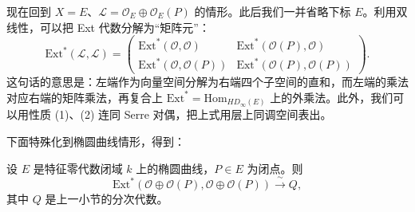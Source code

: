 现在回到 $X=E$、$\mathcal{L}=\mathcal{O}_E\oplus\mathcal{O}_E(P)$ 的情形。此后我们一并省略下标 $E$。利用双线性，可以把 Ext 代数分解为“矩阵元”：
\begin{equation}\label{eq:6.2-1}
\mathrm{Ext}^*(\mathcal{L},\mathcal{L})=
\begin{pmatrix}
\mathrm{Ext}^*(\mathcal{O},\mathcal{O}) & \mathrm{Ext}^*(\mathcal{O}(P),\mathcal{O})\\[2pt]
\mathrm{Ext}^*(\mathcal{O},\mathcal{O}(P)) & \mathrm{Ext}^*(\mathcal{O}(P),\mathcal{O}(P))
\end{pmatrix}.
\end{equation}
这句话的意思是：左端作为向量空间分解为右端四个子空间的直和，而左端的乘法对应右端的矩阵乘法，再复合上 $\mathrm{Ext}^*=\mathrm{Hom}_{HD_\infty(E)}$ 上的外乘法。此外，我们可以用性质 (1)、(2) 连同 Serre 对偶，把上式用层上同调空间表出。


下面特殊化到椭圆曲线情形，得到：

\begin{proposition}\label{prop:6.3}
设 $E$ 是特征零代数闭域 $k$ 上的椭圆曲线，$P\in E$ 为闭点。则
\[
\mathrm{Ext}^*(\mathcal{O}\oplus\mathcal{O}(P),\mathcal{O}\oplus\mathcal{O}(P))\xrightarrow{\ \sim\ }Q,
\]
其中 $Q$ 是上一小节的分次代数。
\end{proposition}

